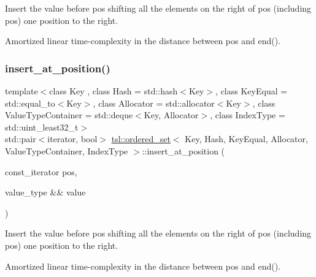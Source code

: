 Insert the value before pos shifting all the elements on the right of pos (including pos) one position to the right.

Amortized linear time-\/complexity in the distance between pos and end(). \mbox{\label{classtsl_1_1ordered__set_aae9f958a17a59a693569a0519685fc0a}} 
\subsubsection{\texorpdfstring{insert\_at\_position()}{insert\_at\_position()}\hspace{0.1cm}{\footnotesize\ttfamily [2/2]}}
{\footnotesize\ttfamily template$<$class Key , class Hash  = std\+::hash$<$\+Key$>$, class Key\+Equal  = std\+::equal\+\_\+to$<$\+Key$>$, class Allocator  = std\+::allocator$<$\+Key$>$, class Value\+Type\+Container  = std\+::deque$<$\+Key, Allocator$>$, class Index\+Type  = std\+::uint\+\_\+least32\+\_\+t$>$ \\
std\+::pair$<$iterator, bool$>$ \mbox{\hyperlink{classtsl_1_1ordered__set}{tsl\+::ordered\+\_\+set}}$<$ Key, Hash, Key\+Equal, Allocator, Value\+Type\+Container, Index\+Type $>$\+::insert\+\_\+at\+\_\+position (\begin{DoxyParamCaption}\item[{const\+\_\+iterator}]{pos,  }\item[{value\+\_\+type \&\&}]{value }\end{DoxyParamCaption})\hspace{0.3cm}{\ttfamily [inline]}}





Insert the value before pos shifting all the elements on the right of pos (including pos) one position to the right.

Amortized linear time-\/complexity in the distance between pos and end(). \mbox{\label{classtsl_1_1ordered__set_a7866c9d599658f12dba6b17fed1b671d}} 
